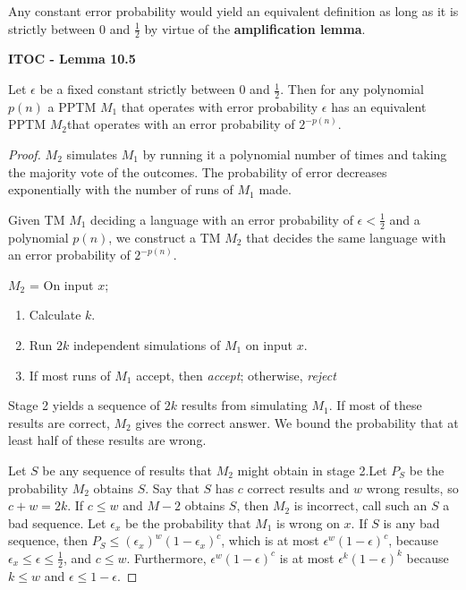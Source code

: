 {\color{blue} Any constant error probability would yield an equivalent definition as long as it is strictly between 0 and $\frac{1}{2}$ by virtue of the \textbf{amplification lemma}.} 

\begin{shaded}
\textbf{ITOC - Lemma 10.5}

\medskip
Let $\epsilon$ be a fixed constant strictly between 0 and $\frac{1}{2}$. Then for any polynomial $p(n)$ a PPTM $M_1$ that operates with error probability $\epsilon$ has an equivalent PPTM $M_2$that operates with an error probability of $2^{-p(n)}$.
\end{shaded}

\begin{mdframed}
\begin{proof}
$M_2$ simulates $M_1$ by running it a polynomial number of times and taking the majority vote of the outcomes. The probability of error decreases exponentially with the number of runs of $M_1$ made.

\medskip
Given TM $M_1$ deciding a language with an error probability of $\epsilon < \frac{1}{2}$ and a polynomial $p(n)$, we construct a TM $M_2$ that decides the same language with an error probability of $2^{-p(n)}$.

\medskip
$M_2$ = On input $x$;
\begin{enumerate}
\item Calculate $k$.
\item Run $2k$ independent simulations of $M_1$ on input $x$.
\item If most runs of $M_1$ accept, then \textit{accept}; otherwise, \textit{reject}
\end{enumerate}

Stage 2 yields a sequence of $2k$ results from simulating $M_1$. If most of these results are correct, $M_2$ gives the correct answer. We bound the probability that at least half of these results are wrong.

Let $S$ be any sequence of results that $M_2$ might obtain in stage 2.Let $P_S$ be the probability $M_2$ obtains $S$. Say that $S$ has $c$ correct results and $w$ wrong results, so $c + w  = 2k$. If $c \leq w$ and $M-2$ obtains $S$, then $M_2$ is incorrect, call such an $S$ a bad sequence. Let $\epsilon_x$ be the probability that $M_1$ is wrong on $x$. If $S$ is any bad sequence, then $P_S \leq  (\epsilon_x)^w (1-\epsilon_x)^c$, which is at most $\epsilon^w (1-\epsilon)^c$, because $\epsilon_x \leq \epsilon \leq \frac{1}{2}$, and $c \leq w$. Furthermore, $\epsilon^w (1-\epsilon)^c$ is at most $\epsilon^k (1- \epsilon)^k$ because $k\leq w$ and $\epsilon \leq 1 -\epsilon$.


\end{proof}
\end{mdframed}
